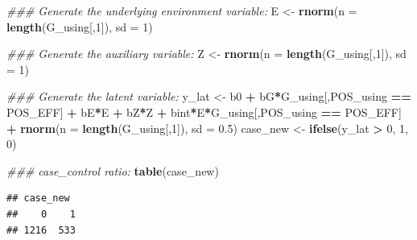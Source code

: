 \documentclass[
]{article}
\newenvironment{Shaded}{\begin{snugshade}}{\end{snugshade}}
\newcommand{\CommentTok}[1]{\textcolor[rgb]{0.56,0.35,0.01}{\textit{#1}}}
\newcommand{\DataTypeTok}[1]{\textcolor[rgb]{0.13,0.29,0.53}{#1}}
\newcommand{\DecValTok}[1]{\textcolor[rgb]{0.00,0.00,0.81}{#1}}
\newcommand{\FloatTok}[1]{\textcolor[rgb]{0.00,0.00,0.81}{#1}}
\newcommand{\KeywordTok}[1]{\textcolor[rgb]{0.13,0.29,0.53}{\textbf{#1}}}
\newcommand{\NormalTok}[1]{#1}
\newcommand{\OperatorTok}[1]{\textcolor[rgb]{0.81,0.36,0.00}{\textbf{#1}}}
\newcommand{\StringTok}[1]{\textcolor[rgb]{0.31,0.60,0.02}{#1}}
\begin{document}
\begin{Shaded}
\begin{Highlighting}[]
\CommentTok{### Generate the underlying environment variable:}
\NormalTok{E <-}\StringTok{ }\KeywordTok{rnorm}\NormalTok{(}\DataTypeTok{n =} \KeywordTok{length}\NormalTok{(G_using[,}\DecValTok{1}\NormalTok{]), }\DataTypeTok{sd =} \DecValTok{1}\NormalTok{)}

\CommentTok{### Generate the auxiliary variable:}
\NormalTok{Z <-}\StringTok{ }\KeywordTok{rnorm}\NormalTok{(}\DataTypeTok{n =} \KeywordTok{length}\NormalTok{(G_using[,}\DecValTok{1}\NormalTok{]), }\DataTypeTok{sd =} \DecValTok{1}\NormalTok{)}

\CommentTok{### Generate the latent variable:}
\NormalTok{y_lat <-}\StringTok{ }\NormalTok{b0 }\OperatorTok{+}\StringTok{ }\NormalTok{bG}\OperatorTok{*}\NormalTok{G_using[,POS_using }\OperatorTok{==}\StringTok{ }\NormalTok{POS_EFF] }\OperatorTok{+}\StringTok{ }\NormalTok{bE}\OperatorTok{*}\NormalTok{E }\OperatorTok{+}\StringTok{ }\NormalTok{bZ}\OperatorTok{*}\NormalTok{Z }\OperatorTok{+}\StringTok{ }\NormalTok{bint}\OperatorTok{*}\NormalTok{E}\OperatorTok{*}\NormalTok{G_using[,POS_using }\OperatorTok{==}\StringTok{ }\NormalTok{POS_EFF] }\OperatorTok{+}\StringTok{ }\KeywordTok{rnorm}\NormalTok{(}\DataTypeTok{n =} \KeywordTok{length}\NormalTok{(G_using[,}\DecValTok{1}\NormalTok{]), }\DataTypeTok{sd =} \FloatTok{0.5}\NormalTok{)}
\NormalTok{case_new <-}\StringTok{ }\KeywordTok{ifelse}\NormalTok{(y_lat }\OperatorTok{>}\StringTok{ }\DecValTok{0}\NormalTok{, }\DecValTok{1}\NormalTok{, }\DecValTok{0}\NormalTok{)}

\CommentTok{### case_control ratio: }
\KeywordTok{table}\NormalTok{(case_new)}
\end{Highlighting}
\end{Shaded}

\begin{verbatim}
## case_new
##    0    1 
## 1216  533
\end{verbatim}
\end{document}
